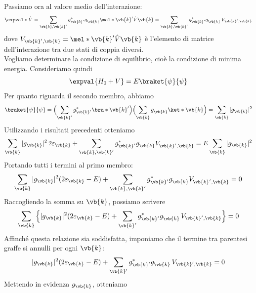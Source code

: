 Passiamo ora al valore medio dell'interazione:
\begin{equation*}
   \expval*{\hat{V}}
   =\sum_{\vb{k},\vb{k}'} g_{\vb{k}'}^* g^{\vphantom{*}}_{\vb{k}}
   \mel*{\vb{k}'}{\hat{V}}{\vb{k}}
   =\sum_{\vb{k},\vb{k}'} g_{\vb{k}'}^* g^{\vphantom{*}}_{\vb{k}}\, V_{\vb{k}',\vb{k}}
\end{equation*}
dove $V_{\vb{k}',\vb{k}}=\mel*{\vb{k}'}{\hat{V}}{\vb{k}}$ è l'elemento di matrice dell'interazione tra due stati di coppia diversi.\\
Vogliamo determinare la condizione di equilibrio, cioè la condizione di minima energia. Consideriamo quindi
\begin{equation*}
   \expval{H_0 + V}
   =
   E \braket{\psi}{\psi}
\end{equation*}
Per quanto riguarda il secondo membro, abbiamo
\begin{equation*}
   \braket{\psi}{\psi}
   =
   \Bigl(\sum_{\vb{k}'} g_{\vb{k}'}^* \bra*{\vb{k}'}\Bigr)
   \Bigl(\sum_{\vb{k}} g^{\vphantom{*}}_{\vb{k}} \ket*{\vb{k}}\Bigr)
   =
   \sum_{\vb{k}} |g_{\vb{k}}|^2
\end{equation*}
Utilizzando i risultati precedenti otteniamo
\begin{equation*}
   \sum_{\vb{k}} |g_{\vb{k}}|^2 \, 2 \varepsilon_{\vb{k}}
   +
   \sum_{\vb{k},\vb{k}'} g_{\vb{k}'}^* g^{\vphantom{*}}_{\vb{k}} V^{\vphantom{*}}_{\vb{k}',\vb{k}}
   =
   E \sum_{\vb{k}} |g_{\vb{k}}|^2
\end{equation*}
Portando tutti i termini al primo membro:
\begin{equation*}
   \sum_{\vb{k}} |g_{\vb{k}}|^2 (2 \varepsilon_{\vb{k}} - E)
   +
   \sum_{\vb{k},\vb{k}'} g_{\vb{k}'}^* g^{\vphantom{*}}_{\vb{k}} V^{\vphantom{*}}_{\vb{k}',\vb{k}}
   = 0
\end{equation*}
Raccogliendo la somma su $\vb{k}$, possiamo scrivere
\begin{equation*}
   \sum_{\vb{k}}
   \Big\{
      |g_{\vb{k}}|^2 (2 \varepsilon_{\vb{k}} - E)
      +
      \sum_{\vb{k}'} g_{\vb{k}'}^* g^{\vphantom{*}}_{\vb{k}} \, V_{\vb{k}',\vb{k}}
   \Big\}
   = 0
\end{equation*}
Affinché questa relazione sia soddisfatta, imponiamo che il termine tra parentesi graffe si annulli per ogni $\vb{k}$:
\begin{equation*}
   |g_{\vb{k}}|^2 (2 \varepsilon_{\vb{k}} - E)
   +
   \sum_{\vb{k}'} g_{\vb{k}'}^* g^{\vphantom{*}}_{\vb{k}} \, V_{\vb{k}',\vb{k}}
   = 0
\end{equation*}
Mettendo in evidenza $g_{\vb{k}}$, otteniamo
